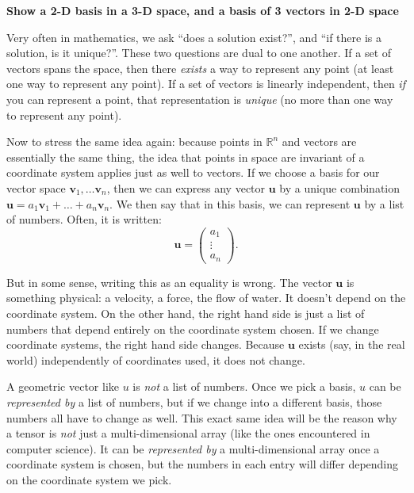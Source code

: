 \documentclass[../master.tex]{subfiles}
\begin{document}
	\textbf{Show a 2-D basis in a 3-D space, and a basis of 3 vectors in 2-D space}

	Very often in mathematics, we ask ``does a solution exist?'', and ``if there is a solution, is it unique?''. These two questions are dual to one another. If a set of vectors spans the space, then there \emph{exists} a way to represent any point (at least one way to represent any point). If a set of vectors is linearly independent, then \emph{if} you can represent a point, that representation is \emph{unique} (no more than one way to represent any point).
	
	Now to stress the same idea again: because points in $\mathbb R^n$ and vectors are essentially the same thing, the idea that points in space are invariant of a coordinate system applies just as well to vectors. If we choose a basis for our vector space $\mathbf v_1, \dots \mathbf v_n$, then we can express any vector $\mathbf u$ by a unique combination $\mathbf u = a_1 \mathbf v_1 + \dots + a_n \mathbf v_n$. We then say that in this basis, we can represent $\mathbf u$ by a list of numbers. Often, it is written:
	\begin{equation*}
		\mathbf u = \begin{pmatrix} a_1 \\ \vdots \\a_n	\end{pmatrix}.
	\end{equation*}
	
	But in some sense, writing this as an equality is wrong. The vector $\mathbf u$ is something physical: a velocity, a force, the flow of water. It doesn't depend on the coordinate system. On the other hand, the right hand side is just a list of numbers that depend entirely on the coordinate system chosen. If we change coordinate systems, the right hand side changes. Because $\mathbf u$ exists (say, in the real world) independently of coordinates used, it does not change.
	
	A geometric vector like $u$ is \emph{not} a list of numbers. Once we pick a basis, $u$ can be \emph{represented by} a list of numbers, but if we change into a different basis, those numbers all have to change as well. This exact same idea will be the reason why a tensor is \emph{not} just a multi-dimensional array (like the ones encountered in computer science). It can be \emph{represented by} a multi-dimensional array once a coordinate system is chosen, but the numbers in each entry will differ depending on the coordinate system we pick. 
	
\end{document}
